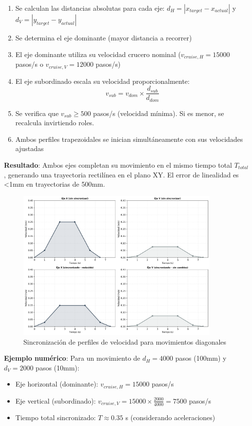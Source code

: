 \begin{enumerate}
    \item Se calculan las distancias absolutas para cada eje: $d_H = |x_{target} - x_{actual}|$ y $d_V = |y_{target} - y_{actual}|$
    \item Se determina el eje dominante (mayor distancia a recorrer)
    \item El eje dominante utiliza su velocidad crucero nominal ($v_{cruise,H} = 15000$ pasos/s o $v_{cruise,V} = 12000$ pasos/s)
    \item El eje subordinado escala su velocidad proporcionalmente:
    \begin{equation}
    v_{sub} = v_{dom} \times \frac{d_{sub}}{d_{dom}}
    \end{equation}
    \item Se verifica que $v_{sub} \geq 500$ pasos/s (velocidad mínima). Si es menor, se recalcula invirtiendo roles.
    \item Ambos perfiles trapezoidales se inician simultáneamente con sus velocidades ajustadas
\end{enumerate}

\textbf{Resultado}: Ambos ejes completan su movimiento en el mismo tiempo total $T_{total}$, generando una trayectoria rectilínea en el plano XY. El error de linealidad es <1mm en trayectorias de 500mm.

\begin{figure}[H]
    \centering
    \includegraphics[width=0.9\textwidth]{imagenes/sincronizacion_multieje.png}
    \caption{Sincronización de perfiles de velocidad para movimientos diagonales}
    \label{fig:sincronizacion_multieje}
\end{figure}

\textbf{Ejemplo numérico}: Para un movimiento de $d_H = 4000$ pasos (100mm) y $d_V = 2000$ pasos (10mm):
\begin{itemize}
    \item Eje horizontal (dominante): $v_{cruise,H} = 15000$ pasos/s
    \item Eje vertical (subordinado): $v_{cruise,V} = 15000 \times \frac{2000}{4000} = 7500$ pasos/s
    \item Tiempo total sincronizado: $T \approx 0.35$ s (considerando aceleraciones)
\end{itemize}
